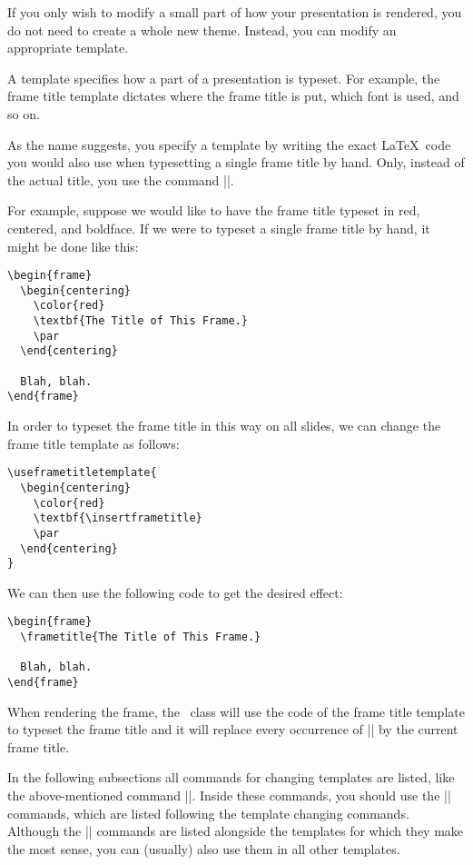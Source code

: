 If you only wish to modify a small part of how your presentation is
rendered, you do not need to create a whole new theme. Instead, you
can modify an appropriate template.

A template specifies how a part of a presentation is typeset. For
example, the frame title template dictates where the frame title is
put, which font is used, and so on.

As the name suggests, you specify a template by writing the exact
\LaTeX\ code you would also use when typesetting a single frame title
by hand. Only, instead of the actual title, you use the command
|\insertframetitle|.

For example, suppose we would like to have the frame title typeset in
red, centered, and boldface. If we were to typeset a single frame
title by hand, it might be done like this:
\begin{verbatim}
\begin{frame}
  \begin{centering}
    \color{red}
    \textbf{The Title of This Frame.}
    \par
  \end{centering}

  Blah, blah.
\end{frame}
\end{verbatim}

In order to typeset the frame title in this way on all slides, we can
change the frame title template as follows:
\begin{verbatim}
\useframetitletemplate{
  \begin{centering}
    \color{red}
    \textbf{\insertframetitle}
    \par
  \end{centering}
}
\end{verbatim}

We can then use the following code to get the desired effect:
\begin{verbatim}
\begin{frame}
  \frametitle{The Title of This Frame.}

  Blah, blah.
\end{frame}
\end{verbatim}

When rendering the frame, the \beamer\ class will use the code of the
frame title template to typeset the frame title and it will replace
every occurrence of |\insertframetitle| by the current frame
title.

In the following subsections all commands for changing templates are
listed, like the above-mentioned command
|\useframetitletemplate|. Inside these commands, you should use
the |\insertxxxx| commands, which are listed following the template
changing commands. Although the |\insertxxxx| commands are listed
alongside the templates for which they make the most sense, you can
(usually) also use them in all other templates.

